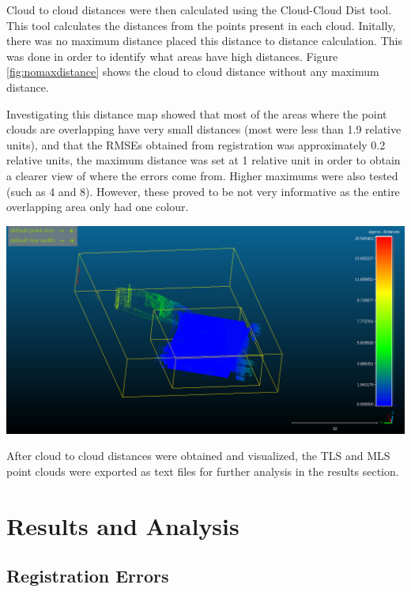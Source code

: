 \documentclass[man]{apa7}
\begin{document}
Cloud to cloud distances were then calculated using the Cloud-Cloud Dist tool. This tool calculates the distances from the points present in each cloud. Initally, there was no maximum distance placed this distance to distance calculation. This was done in order to identify what areas have high distances. Figure \ref{fig:nomaxdistance} shows the cloud to cloud distance without any maximum distance. 


Investigating this distance map showed that most of the areas where the point clouds are overlapping have very small distances (most were less than 1.9 relative units), and that the RMSEs obtained from registration was approximately 0.2 relative units, the maximum distance was set at 1 relative unit in order to obtain a clearer view of where the errors come from. Higher maximums were also tested (such as 4 and 8). However, these proved to be not very informative as the entire overlapping area only had one colour.

\begin{minipage}{\linewidth}
  \includegraphics[height=\textheight/2 ,width=\textwidth/1]{figures/noMaxDistance.png}
  \label{fig:nomaxdistance}
\end{minipage}

After cloud to cloud distances were obtained and visualized, the TLS and MLS point clouds were exported as text files for further analysis in the results section. 
\newpage
\section{Results and Analysis}

\subsection{Registration Errors}
\end{document}
